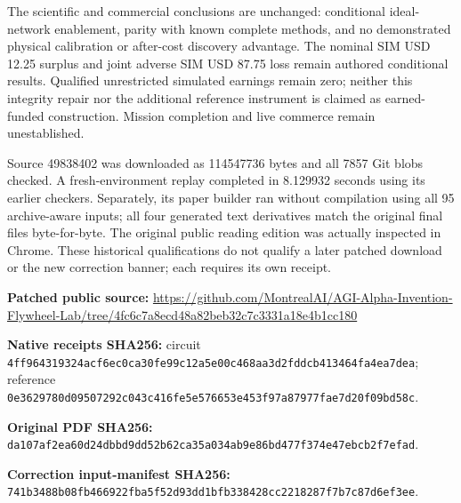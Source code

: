 \documentclass[10pt,letterpaper]{article}
\begin{document}
The scientific and commercial conclusions are unchanged: conditional ideal-network enablement, parity with known complete methods, and no demonstrated physical calibration or after-cost discovery advantage. The nominal SIM USD 12.25 surplus and joint adverse SIM USD 87.75 loss remain authored conditional results. Qualified unrestricted simulated earnings remain zero; neither this integrity repair nor the additional reference instrument is claimed as earned-funded construction. Mission completion and live commerce remain unestablished.\par
Source 49838402 was downloaded as 114547736 bytes and all 7857 Git blobs checked. A fresh-environment replay completed in 8.129932 seconds using its earlier checkers. Separately, its paper builder ran without compilation using all 95 archive-aware inputs; all four generated text derivatives match the original final files byte-for-byte. The original public reading edition was actually inspected in Chrome. These historical qualifications do not qualify a later patched download or the new correction banner; each requires its own receipt.\par
{\footnotesize\textbf{Patched public source:} \url{https://github.com/MontrealAI/AGI-Alpha-Invention-Flywheel-Lab/tree/4fc6c7a8ecd48a82beb32c7c3331a18e4b1cc180}\par
\textbf{Native receipts SHA256:} circuit \texttt{4ff964319324\allowbreak{}acf6ec0ca30f\allowbreak{}e99c12a5e00c\allowbreak{}468aa3d2fddc\allowbreak{}b413464fa4ea\allowbreak{}7dea}; reference \texttt{0e3629780d09\allowbreak{}507292c043c4\allowbreak{}16fe5e576653\allowbreak{}e453f97a8797\allowbreak{}7fae7d20f09b\allowbreak{}d58c}.\par
\textbf{Original PDF SHA256:} \texttt{da107af2ea60\allowbreak{}d24dbbd9dd52\allowbreak{}b62ca35a034a\allowbreak{}b9e86bd477f3\allowbreak{}74e47ebcb2f7\allowbreak{}efad}.\par
\textbf{Correction input-manifest SHA256:} \texttt{741b3488b08f\allowbreak{}b466922fba5f\allowbreak{}52d93dd1bfb3\allowbreak{}38428cc22182\allowbreak{}87f7b7c87d6e\allowbreak{}f3ee}.\par}
\end{document}
